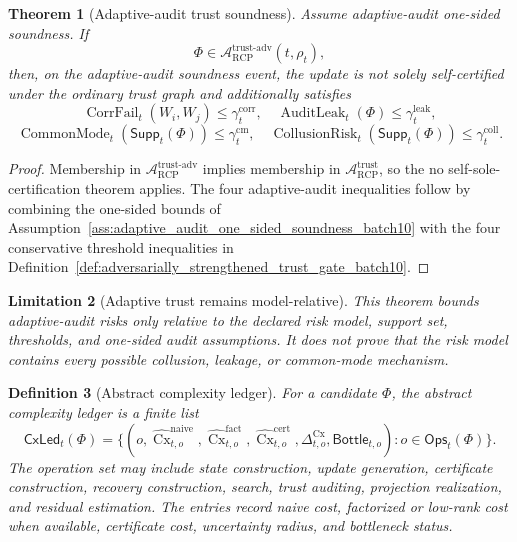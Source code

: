 \documentclass[11pt]{article}
\newtheorem{theorem}{Theorem}[section]
\newtheorem{definition}[theorem]{Definition}
\newtheorem{limitation}[theorem]{Limitation}
\newcommand{\Acal}{\mathcal{A}}
\newcommand{\1}{\mathbf{1}}
\newcommand{\RCP}{\mathrm{RCP}}
\providecommand{\CorrFail}{\operatorname{CorrFail}}
\providecommand{\AuditLeak}{\operatorname{AuditLeak}}
\providecommand{\CommonMode}{\operatorname{CommonMode}}
\providecommand{\CollusionRisk}{\operatorname{CollusionRisk}}
\providecommand{\Cx}{\operatorname{Cx}}
\begin{document}
\begin{theorem}[Adaptive-audit trust soundness]
\label{thm:adaptive_audit_trust_soundness_batch10}
Assume adaptive-audit one-sided soundness.  If
\[
\Phi\in\Acal_{\RCP}^{\mathrm{trust\mbox{-}adv}}(t,\rho_t),
\]
then, on the adaptive-audit soundness event, the update is not solely self-certified under the ordinary trust graph and additionally satisfies
\[
\CorrFail_t(W_i,W_j)\le\gamma_t^{\mathrm{corr}},
\quad
\AuditLeak_t(\Phi)\le\gamma_t^{\mathrm{leak}},
\]
\[
\CommonMode_t(\mathsf{Supp}_t(\Phi))\le\gamma_t^{\mathrm{cm}},
\quad
\CollusionRisk_t(\mathsf{Supp}_t(\Phi))\le\gamma_t^{\mathrm{coll}}.
\]
\end{theorem}

\begin{proof}
Membership in \(\Acal_{\RCP}^{\mathrm{trust\mbox{-}adv}}\) implies membership in \(\Acal_{\RCP}^{\mathrm{trust}}\), so the no self-sole-certification theorem applies.  The four adaptive-audit inequalities follow by combining the one-sided bounds of Assumption~\ref{ass:adaptive_audit_one_sided_soundness_batch10} with the four conservative threshold inequalities in Definition~\ref{def:adversarially_strengthened_trust_gate_batch10}.
\end{proof}

\begin{limitation}[Adaptive trust remains model-relative]
This theorem bounds adaptive-audit risks only relative to the declared risk model, support set, thresholds, and one-sided audit assumptions.  It does not prove that the risk model contains every possible collusion, leakage, or common-mode mechanism.
\end{limitation}

\begin{definition}[Abstract complexity ledger]
\label{def:abstract_complexity_ledger_batch10}
For a candidate \(\Phi\), the abstract complexity ledger is a finite list
\[
\mathsf{CxLed}_t(\Phi)=
\{(o,\widehat{\Cx}_{t,o}^{\mathrm{naive}},\widehat{\Cx}_{t,o}^{\mathrm{fact}},\widehat{\Cx}_{t,o}^{\mathrm{cert}},\Delta_{t,o}^{\Cx},\mathsf{Bottle}_{t,o}) : o\in\mathsf{Ops}_t(\Phi)\}.
\]
The operation set may include state construction, update generation, certificate construction, recovery construction, search, trust auditing, projection realization, and residual estimation.  The entries record naive cost, factorized or low-rank cost when available, certificate cost, uncertainty radius, and bottleneck status.
\end{definition}
\end{document}
